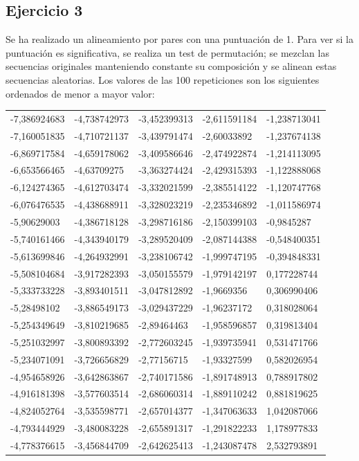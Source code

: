 \subsection{Ejercicio 3}
Se ha realizado un alineamiento por pares con una puntuación de 1. Para ver si la puntuación es significativa, se realiza un test de permutación; se mezclan las secuencias originales manteniendo constante su composición y se alinean estas secuencias aleatorias. Los valores de las 100 repeticiones son los siguientes ordenados de menor a mayor valor:
\begin{table}[]
\begin{tabular}{lllll}
-7,386924683 & -4,738742973 & -3,452399313 & -2,611591184 & -1,238713041 \\
-7,160051835 & -4,710721137 & -3,439791474 & -2,60033892  & -1,237674138 \\
-6,869717584 & -4,659178062 & -3,409586646 & -2,474922874 & -1,214113095 \\
-6,653566465 & -4,63709275  & -3,363274424 & -2,429315393 & -1,122888068 \\
-6,124274365 & -4,612703474 & -3,332021599 & -2,385514122 & -1,120747768 \\
-6,076476535 & -4,438688911 & -3,328023219 & -2,235346892 & -1,011586974 \\
-5,90629003  & -4,386718128 & -3,298716186 & -2,150399103 & -0,9845287   \\
-5,740161466 & -4,343940179 & -3,289520409 & -2,087144388 & -0,548400351 \\
-5,613699846 & -4,264932991 & -3,238106742 & -1,999747195 & -0,394848331 \\
-5,508104684 & -3,917282393 & -3,050155579 & -1,979142197 & 0,177228744  \\
-5,333733228 & -3,893401511 & -3,047812892 & -1,9669356   & 0,306990406  \\
-5,28498102  & -3,886549173 & -3,029437229 & -1,96237172  & 0,318028064  \\
-5,254349649 & -3,810219685 & -2,89464463  & -1,958596857 & 0,319813404  \\
-5,251032997 & -3,800893392 & -2,772603245 & -1,939735941 & 0,531471766  \\
-5,234071091 & -3,726656829 & -2,77156715  & -1,93327599  & 0,582026954  \\
-4,954658926 & -3,642863867 & -2,740171586 & -1,891748913 & 0,788917802  \\
-4,916181398 & -3,577603514 & -2,686060314 & -1,889110242 & 0,881819625  \\
-4,824052764 & -3,535598771 & -2,657014377 & -1,347063633 & 1,042087066  \\
-4,793444929 & -3,480083228 & -2,655891317 & -1,291822233 & 1,178977833  \\
-4,778376615 & -3,456844709 & -2,642625413 & -1,243087478 & 2,532793891 
\end{tabular}
\end{table}

